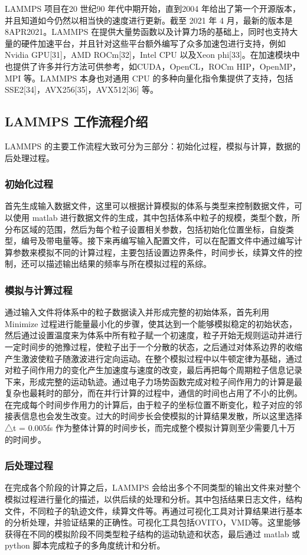 LAMMPS 项目在20 世纪90 年代中期开始，直到2004 年给出了第一个开源版本，并且知道如今仍然以相当快的速度进行更新。截至 2021 年 4 月，最新的版本是8APR2021。LAMMPS 在提供大量势函数以及计算力场的基础上，同时也支持大量的硬件加速平台，并且针对这些平台额外编写了众多加速包进行支持，例如Nvidia GPU[31]，AMD ROCm[32]，Intel CPU 以及Xeon phi[33]。在加速模块中也提供了许多并行方法可供参考，如CUDA，OpenCL，ROCm HIP，OpenMP， MPI 等。LAMMPS 本身也对通用 CPU 的多种向量化指令集提供了支持，包括SSE2[34]，AVX256[35]，AVX512[36] 等。

\subsection{LAMMPS 工作流程介绍}
LAMMPS 的主要工作流程大致可分为三部分：初始化过程，模拟与计算，数据的后处理过程。

\subsubsection{初始化过程}
首先生成输入数据文件，这里可以根据计算模拟的体系与类型来控制数据文件，可以使用 matlab 进行数据文件的生成，其中包括体系中粒子的规模，类型个数，所分布区域的范围，然后为每个粒子设置相关参数，包括初始化位置坐标，自旋类型，编号及带电量等。接下来再编写输入配置文件，可以在配置文件中通过编写计算参数来模拟不同的计算过程，主要包括设置边界条件，时间步长，续算文件的控制，还可以描述输出结果的频率与所在模拟过程的系综。

\subsubsection{模拟与计算过程}
通过输入文件将体系中的粒子数据读入并形成完整的初始体系，首先利用Minimize 过程进行能量最小化的步骤，使其达到一个能够模拟稳定的初始状态，然后通过设置温度来为体系中所有粒子赋一个初速度，粒子开始无规则运动并进行一定时间步的弛豫过程，使粒子出于一个分散的状态，之后通过对体系边界的收缩产生激波使粒子随激波进行定向运动。在整个模拟过程中以牛顿定律为基础，通过对粒子间作用力的变化产生加速度与速度的改变，最后再把每个周期粒子信息记录下来，形成完整的运动轨迹。通过电子力场势函数完成对粒子间作用力的计算是最复杂也最耗时的部分，而在并行计算的过程中，通信的时间也占用了不小的比例。在完成每个时间步作用力的计算后，由于粒子的坐标位置不断变化，粒子对应的邻接表信息也会发生改变。过大的时间步长会使模拟的计算结果发散，所以这里选择△t = 0.005fs 作为整体计算的时间步长，而完成整个模拟计算则至少需要几十万的时间步。

\subsubsection{后处理过程}
在完成各个阶段的计算之后，LAMMPS 会给出多个不同类型的输出文件来对整个模拟过程进行量化的描述，以供后续的处理和分析。其中包括结果日志文件，结构文件，不同粒子的轨迹文件，续算文件等。再通过可视化工具对计算结果进行基本的分析处理，并验证结果的正确性。可视化工具包括OVITO，VMD等。这里能够获得在不同的模拟阶段不同类型粒子结构的运动轨迹和状态，最后通过 matlab 或 python 脚本完成粒子的多角度统计和分析。

